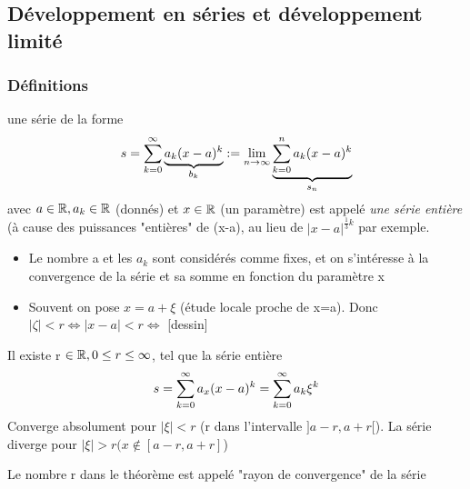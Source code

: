 \documentclass[12pt,a4paper]{article}
\begin{document}
{\subsection{Développement en séries et développement limité}
\subsubsection{Définitions}
\begin{boite}
	 une série de la forme
	\begin{equation}
		s = \sum\limits_{k=0}^{\infty} \underbrace{a_k (x-a)^k}_{b_k} := \lim\limits_{n \to \infty} \underbrace{\sum\limits_{k=0}^{n}a_k(x-a)^k}_{s_n}
	\end{equation}
	avec $a\in  \mathbb{R}, a_k \in \mathbb{R}$ (donnés) et $x \in \mathbb{R}$ (un paramètre) est appelé  \textit{une série entière} (à cause des puissances "entières" de (x-a), au lieu de $|x-a|^{\frac{1}{3}k}$ par exemple.
\end{boite}
\begin{itemize}
	\item Le nombre a et les $a_k$ sont considérés comme fixes, et on s'intéresse à la convergence de la série et sa somme en fonction du paramètre x
	\item Souvent on pose $x = a+\xi$ (étude locale proche de x=a). Donc $|\zeta| < r \iff |x-a| < r \iff$ [dessin]
\end{itemize}

\begin{boite}
	\Theoreme Il existe r $\in \mathbb{R}, 0 \leq r \leq \infty$, tel que la série entière 
	\begin{equation}
		s = \sum\limits_{k=0}^{\infty}{a_x(x-a)^k} = \sum\limits_{k=0}^{\infty}{a_k\xi^k}
	\end{equation}
	Converge absolument pour $|\xi| < r$ (r dans l'intervalle $]a-r,a+r[$). La série diverge pour $|\xi| > r (x \not \in [a-r,a+r]$)
\end{boite}
\begin{boite}
	\Definition Le nombre r dans le théorème est appelé "rayon de convergence" de la série
\end{boite}

}
\end{document}
